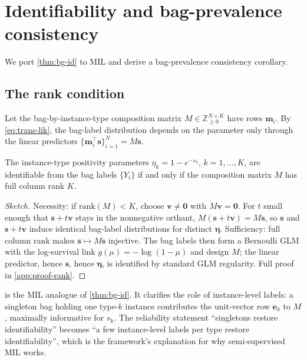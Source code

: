 \section{Identifiability and bag-prevalence consistency}
\label{sec:identifiability}

We port \cref{thm:bg-id} to MIL and derive a bag-prevalence
consistency corollary.

\subsection{The rank condition}

Let the bag-by-instance-type composition matrix
$M \in \mathbb{Z}_{\geq 0}^{N \times K}$ have rows $\bm{m}_i$. By
\eqref{eq:trans-lik}, the bag-label distribution depends on the
parameter only through the linear predictors
$\{\bm{m}_i^\top \bm{s}\}_{i=1}^N = M\bm{s}$.

\begin{theorem}
\label{thm:rank}
The instance-type positivity parameters
$\eta_k = 1 - e^{-s_k}$, $k = 1,\ldots,K$, are identifiable from the
bag labels $\{Y_i\}$ if and only if the composition matrix $M$ has
full column rank $K$.
\end{theorem}

\begin{proof}[Sketch]
Necessity: if $\mathrm{rank}(M) < K$, choose $\bm{v} \neq \bm{0}$
with $M\bm{v} = \bm{0}$. For $t$ small enough that
$\bm{s} + t\bm{v}$ stays in the nonnegative orthant, $M(\bm{s} +
t\bm{v}) = M\bm{s}$, so $\bm{s}$ and $\bm{s} + t\bm{v}$ induce
identical bag-label distributions for distinct $\bm{\eta}$.
Sufficiency: full column rank makes $\bm{s} \mapsto M\bm{s}$
injective. The bag labels then form a Bernoulli GLM with the
log-survival link $g(\mu) = -\log(1-\mu)$ and design $M$; the linear
predictor, hence $\bm{s}$,
hence $\bm{\eta}$, is identified by standard GLM regularity. Full
proof in \cref{app:proof-rank}.
\end{proof}

 is the MIL analogue of \cref{thm:bg-id}. It
clarifies the role of instance-level labels: a singleton bag holding
one type-$k$ instance contributes the unit-vector row $\bm{e}_k$ to
$M$, maximally informative for $s_k$. The reliability statement
``singletons restore identifiability'' becomes ``a few instance-level
labels per type restore identifiability'', which is the framework's
explanation for why semi-supervised MIL works.

